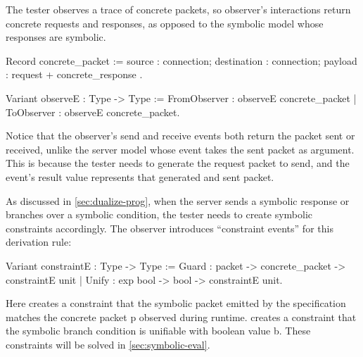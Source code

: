 The tester observes a trace of concrete packets, so observer's interactions
return concrete requests and responses, as opposed to the symbolic model whose
responses are symbolic.
\begin{coq}
  Record concrete_packet := {
    source      : connection;
    destination : connection;
    payload     : request + concrete_response
  }.

  Variant observeE : Type -> Type :=
    FromObserver   : observeE concrete_packet
  | ToObserver     : observeE concrete_packet.
\end{coq}

Notice that the observer's send and receive events both return the packet sent
or received, unlike the server model whose  event takes the sent
packet as argument.  This is because the tester needs to generate the request
packet to send, and the event's result value represents that generated and sent
packet.

As discussed in \autoref{sec:dualize-prog}, when the server sends a symbolic
response or branches over a symbolic condition, the tester needs to create
symbolic constraints accordingly.  The observer introduces ``constraint events''
for this derivation rule:
\begin{coq}
  Variant constraintE : Type -> Type :=
    Guard : packet -> concrete_packet -> constraintE unit
  | Unify : exp bool -> bool -> constraintE unit.
\end{coq}

Here  creates a constraint that the symbolic packet 
emitted by the specification matches the concrete packet \ilc p observed during
runtime.   creates a constraint that the symbolic branch
condition  is unifiable with boolean value \ilc b.  These constraints
will be solved in \autoref{sec:symbolic-eval}.

